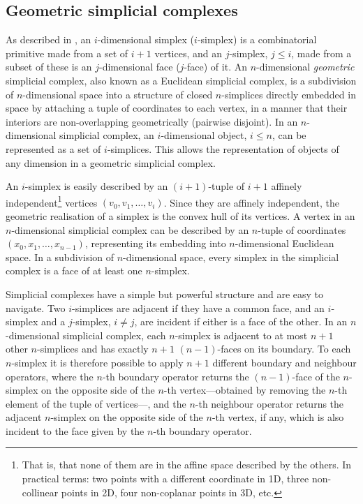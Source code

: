 \subsection{Geometric simplicial complexes}
\label{ss:simplicial-complexes}

As described in , an $i$-dimensional simplex ($i$-simplex) is a combinatorial primitive made from a set of $i+1$ vertices, and an $j$-simplex, $j \leq i$, made from a subset of these is an $j$-dimensional face ($j$-face) of it.
An $n$-dimensional \emph{geometric} simplicial complex, also known as a Euclidean simplicial complex, is a subdivision of $n$-dimensional space into a structure of closed $n$-simplices directly embedded in space by attaching a tuple of coordinates to each vertex, in a manner that their interiors are non-overlapping geometrically (pairwise disjoint).
In an $n$-dimensional simplicial complex, an $i$-dimensional object, $i \leq n$, can be represented as a set of $i$-simplices.
This allows the representation of objects of any dimension in a geometric simplicial complex.

An $i$-simplex is easily described by an $(i+1)$-tuple of $i+1$ affinely independent\footnote{That is, that none of them are in the affine space described by the others.
In practical terms: two points with a different coordinate in 1D, three non-collinear points in 2D, four non-coplanar points in 3D, etc.} vertices $(v_{0}, v_{1}, \ldots, v_{i})$.
Since they are affinely independent, the geometric realisation of a simplex is the convex hull of its vertices.
A vertex in an $n$-dimensional simplicial complex can be described by an $n$-tuple of coordinates $(x_{0}, x_{1}, \ldots, x_{n-1})$, representing its embedding into $n$-dimensional Euclidean space.
In a subdivision of $n$-dimensional space, every simplex in the simplicial complex is a face of at least one $n$-simplex.

Simplicial complexes have a simple but powerful structure and are easy to navigate.
Two $i$-simplices are adjacent if they have a common face, and an $i$-simplex and a $j$-simplex, $i \neq j$, are incident if either is a face of the other.
In an $n$-dimensional simplicial complex, each $n$-simplex is adjacent to at most $n+1$ other $n$-simplices and has exactly $n+1$ $(n-1)$-faces on its boundary.
To each $n$-simplex it is therefore possible to apply $n+1$ different boundary and neighbour operators, where the $n$-th boundary operator returns the $(n-1)$-face of the $n$-simplex on the opposite side of the $n$-th vertex---obtained by removing the $n$-th element of the tuple of vertices---, and the $n$-th neighbour operator returns the adjacent $n$-simplex on the opposite side of the $n$-th vertex, if any, which is also incident to the face given by the $n$-th boundary operator.

